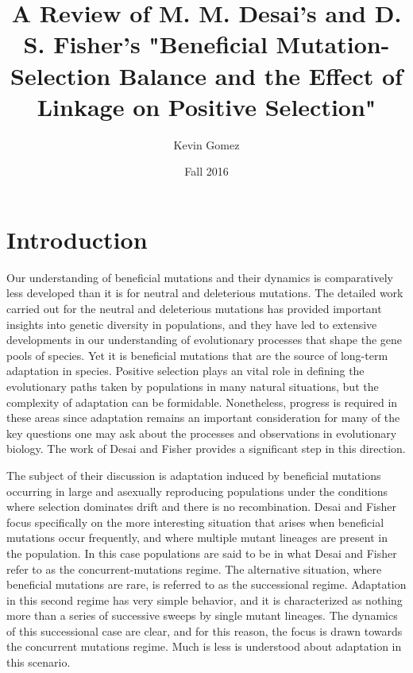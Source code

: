 \documentclass[12pt, one column]{article}
\title{A Review of M. M. Desai's and D. S. Fisher's "Beneficial Mutation-Selection Balance and the Effect of Linkage on Positive Selection"}
\date{Fall 2016}
\author{Kevin Gomez}
\begin{document}
\maketitle
\newpage


\newpage
\section*{Introduction}
Our understanding of beneficial mutations and their dynamics is comparatively less developed than it is for neutral and deleterious mutations.  The detailed work carried out for the neutral and deleterious mutations has provided important insights into genetic diversity in populations, and they have led to extensive developments in our understanding of evolutionary processes that shape the gene pools of species.  Yet it is beneficial mutations that are the source of long-term adaptation in species.  Positive selection plays an vital role in defining the evolutionary paths taken by populations in many natural situations, but the complexity of adaptation can be formidable.  Nonetheless, progress is required in these areas since adaptation remains an important consideration for many of the key questions one may ask about the processes and observations in evolutionary biology.  The work of Desai and Fisher provides a significant step in this direction.

The subject of their discussion is adaptation induced by beneficial mutations occurring in large and asexually reproducing populations under the conditions where selection dominates drift and there is no recombination.  Desai and Fisher focus specifically on the more interesting situation that arises when beneficial mutations occur frequently, and where multiple mutant lineages are present in the population.  In this case populations are said to be in what Desai and Fisher refer to as the concurrent-mutations regime.  The alternative situation, where beneficial mutations are rare, is referred to as the successional regime.  Adaptation in this second regime has very simple behavior, and it is characterized as nothing more than a series of successive sweeps by single mutant lineages.  The dynamics of this successional case are clear, and for this reason, the focus is drawn towards the concurrent mutations regime.  Much is less is understood about adaptation in this scenario.
\end{document}
